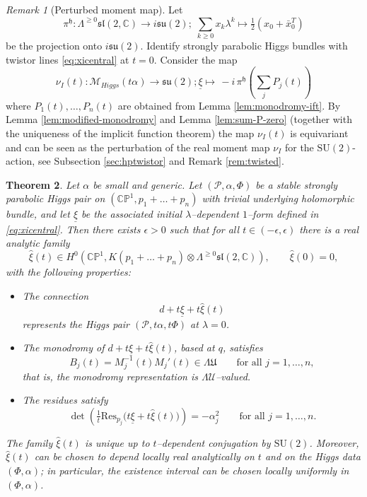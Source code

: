 \documentclass[12pt,a4paper]{amsart}
\newtheorem{theorem}{Theorem}[section]
\theoremstyle{definition}
\theoremstyle{remark}
\newtheorem{remark}[theorem]{Remark}
\newcommand{\C}{\mathbb C}
\newcommand{\CP}{\mathbb{CP}}
\newcommand{\Res}{\mathrm{Res}}
\newcommand{\Pcal}{\mathcal P}
\begin{document}
\begin{remark}[Perturbed moment map]
Let 
\[\pi^\mathfrak h\colon \Lambda^{\geq0}\mathfrak{sl}(2,\C)\to i\mathfrak{su}(2);\; \sum_{k\geq0}x_k\lambda^k\mapsto \tfrac{1}{2}(x_0+\bar x_0^T)\]
be the projection onto $i\mathfrak{su}(2)$. 
Identify strongly parabolic Higgs bundles with twistor lines \eqref{eq:xicentral} at $t=0.$
Consider
the map 
\[\nu_I(t)\colon \mathcal M_{Higgs}(t\alpha)\to\mathfrak{su}(2); 
\underline\xi\mapsto \,-i\,\pi^\mathfrak h\left(\sum_j P_j(t)\right)\]
where $P_1(t),\dots,P_n(t)$ are 
obtained from Lemma \ref{lem:monodromy-ift}.
By Lemma \ref{lem:modified-monodromy} and 
Lemma \ref{lem:sum-P-zero} (together with the uniqueness of the implicit function theorem) the map
 $\nu_I(t)$ is equivariant and can be seen as the perturbation of the real moment map $\nu_I$ for the $\mathrm{SU}(2)$-action, see Subsection \ref{sec:hptwistor} and
Remark \ref{rem:twisted}.
\end{remark}

\begin{theorem}\label{thm:real-holomorphic-section-existence}
Let $\alpha$ be small and generic.
Let $(\Pcal,\alpha,\Phi)$ be a stable strongly parabolic Higgs pair on
$(\CP^1,p_1+\dots+p_n)$ with trivial underlying holomorphic bundle, and let $\underline\xi$ be the associated
initial $\lambda$--dependent $1$--form defined in \eqref{eq:xicentral}.
Then there exists $\epsilon>0$ such that for all $t\in(-\epsilon,\epsilon)$ there is a
real analytic family
\[
\hat\xi(t)\in
H^0\!\left(
\CP^1,
K(p_1+\dots+p_n)\otimes\Lambda^{\geq0}\mathfrak{sl}(2,\C)
\right),
\qquad \hat\xi(0)=0,
\]
with the following properties:
\begin{itemize}
\item[(i)]
The connection
\[
d+t\underline\xi+t\hat\xi(t)
\]
represents the Higgs pair $(\Pcal,t\alpha,t\Phi)$ at $\lambda=0$.

\item[(ii)]
The monodromy of $d+t\underline\xi+t\hat\xi(t)$, based at $q$, satisfies
\[
B_j(t)=M_j^{-1}(t)M_j'(t)\in \Lambda\mathfrak U
\qquad \text{for all } j=1,\dots,n,
\]
that is, the monodromy representation is $\Lambda\mathcal U$--valued.

\item[(iii)]
The residues satisfy
\[
\det\!\left(\tfrac{1}{t}\Res_{p_j}\bigl(t\underline\xi+t\hat\xi(t)\bigr)\right)
=-\alpha_j^2
\qquad\text{for all } j=1,\dots,n.
\]
\end{itemize}

The family $\hat\xi(t)$ is unique up to $t$--dependent conjugation by
$\mathrm{SU}(2)$.
Moreover, $\hat\xi(t)$ can be chosen to depend locally real analytically on $t$
and on the Higgs data $(\Phi,\alpha)$; in particular, the existence interval
can be chosen locally uniformly in $(\Phi,\alpha)$.
\end{theorem}
\end{document}
